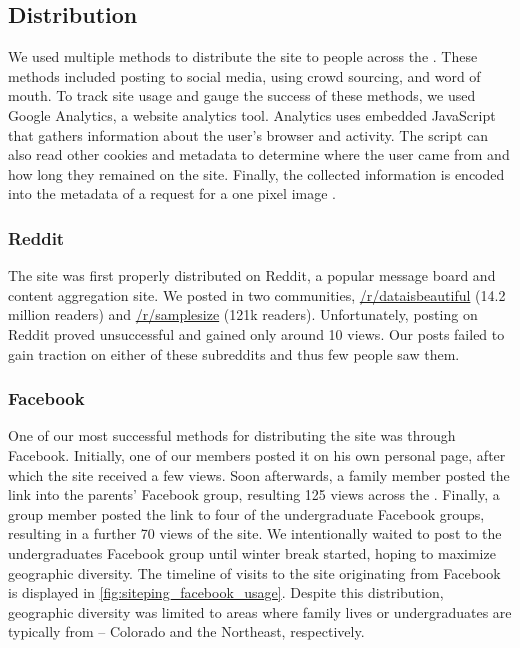 \subsection{Distribution}

We used multiple methods to distribute the site to people across the \us. These methods included posting to social media, using crowd sourcing, and word of mouth. To track site usage and gauge the success of these methods, we used Google Analytics, a website analytics tool. Analytics uses embedded JavaScript that gathers information about the user's browser and activity. The script can also read other cookies and metadata to determine where the user came from and how long they remained on the site. Finally, the collected information is encoded into the metadata of a request for a one pixel image \cite{Googlea}.

\subsubsection{Reddit}

The site was first properly distributed on Reddit, a popular message board and content aggregation site. We posted in two communities, \href{https://reddit.com/r/dataisbeautiful}{/r/dataisbeautiful} (14.2 million readers) and \href{https://reddit.com/r/samplesize}{/r/samplesize} (121k readers). Unfortunately, posting on Reddit proved unsuccessful and gained only around 10 views. Our posts failed to gain traction on either of these subreddits and thus few people saw them.

\subsubsection{Facebook}

One of our most successful methods for distributing the site was through Facebook. Initially, one of our members posted it on his own personal page, after which the site received a few views. Soon afterwards, a family member posted the link into the \wpi parents' Facebook group, resulting 125 views across the \us. Finally, a group member posted the link to four of the \wpi undergraduate Facebook groups, resulting in a further 70 views of the site. We intentionally waited to post to the \wpi undergraduates Facebook group until winter break started, hoping to maximize geographic diversity. The timeline of visits to the site originating from Facebook is displayed in \cref{fig:siteping_facebook_usage}. Despite this distribution, geographic diversity was limited to areas where family lives or \wpi undergraduates are typically from -- Colorado and the Northeast, respectively.

